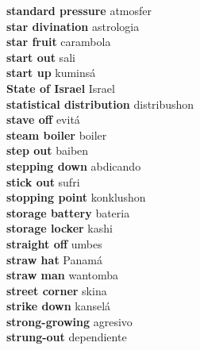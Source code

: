 \textbf{ standard pressure  } atmosfer \\
\textbf{ star divination  } astrologia \\
\textbf{ star fruit  } carambola \\
\textbf{ start out  } sali \\
\textbf{ start up  } kuminsá \\
\textbf{ State of Israel  } Israel \\
\textbf{ statistical distribution  } distribushon \\
\textbf{ stave off  } evitá \\
\textbf{ steam boiler  } boiler \\
\textbf{ step out  } baiben \\
\textbf{ stepping down  } abdicando \\
\textbf{ stick out  } sufri \\
\textbf{ stopping point  } konklushon \\
\textbf{ storage battery  } bateria \\
\textbf{ storage locker  } kashi \\
\textbf{ straight off  } umbes \\
\textbf{ straw hat  } Panamá \\
\textbf{ straw man  } wantomba \\
\textbf{ street corner  } skina \\
\textbf{ strike down  } kanselá \\
\textbf{ strong-growing  } agresivo \\
\textbf{ strung-out  } dependiente \\
